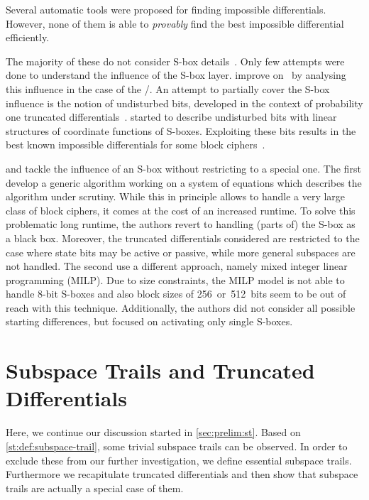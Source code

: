 Several automatic tools were proposed for finding impossible differentials.
However, none of them is able to \emph{provably} find the best impossible differential efficiently.

The majority of these do not consider S-box details~.
Only few attempts were done to understand the influence of the S-box layer.
\textcite{DCC:WanJin17} improve on~\cite{EC:SLGRL16} by analysing this influence in the case of the \AES/.
An attempt to partially cover the S-box influence is the notion of undisturbed bits, developed in the context of probability one truncated differentials~\cite{CAM:Tezcan14}.
\textcite{LIGHTSEC:MakTez14} started to describe undisturbed bits with linear structures of coordinate functions of S-boxes.
Exploiting these bits results in the best known impossible differentials for some block ciphers~.

\textcite{C:DerFou16} and \textcite{EC:SasTod17} tackle the influence of an S-box without restricting to a special one.
The first develop a generic algorithm working on a system of equations which describes the algorithm under scrutiny.
While this in principle allows to handle a very large class of block ciphers, it comes at the cost of an increased runtime.
To solve this problematic long runtime, the authors revert to handling (parts of) the S-box as a black box.
Moreover, the truncated differentials considered are restricted to the case where state bits may be active or passive, while more general subspaces are not handled.
The second use a different approach, namely mixed integer linear programming (MILP).
Due to size constraints, the MILP model is not able to handle 8-bit S-boxes and also block sizes of 256~or~512~bits seem to be out of reach with this technique.
Additionally, the authors did not consider all possible starting differences, but focused on activating only single S-boxes.

\section{Subspace Trails and Truncated Differentials}\label{sec:st:prelim}

Here, we continue our discussion started in \cref{sec:prelim:st}.
Based on \cref{st:def:subspace-trail}, some trivial subspace trails can be observed.
In order to exclude these from our further investigation, we define essential subspace trails.
Furthermore we recapitulate truncated differentials and then show that subspace trails are actually a special case of them.


